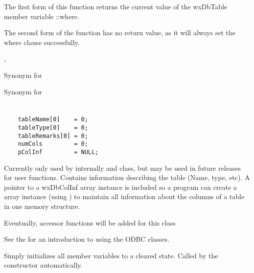 


The first form of this function returns the current value of the wxDbTable
member variable ::where.

The second form of the function has no return value, as it will always set
the where clause successfully.


,

\label{wxdbtableplusplus}


Synonym for 



\label{wxdbtableminusminus}


Synonym for 



\section{}\label{wxdbtableinf}

\begin{verbatim}
    tableName[0]    = 0;
    tableType[0]    = 0;
    tableRemarks[0] = 0;
    numCols         = 0;
    pColInf         = NULL;
\end{verbatim}

Currently only used by  internally
and  class, but may be used in future releases for
user functions.  Contains information describing the table (Name, type, etc).
A pointer to a wxDbColInf array instance is included so a program can create a
 array instance (using
)
to maintain all information about the columns of a table in one memory
structure.

Eventually, accessor functions will be added for this class

See the  for
an introduction to using the ODBC classes.

\label{wxdbtableinfinitialize}

Simply initializes all member variables to a cleared state.  Called by
the constructor automatically.

